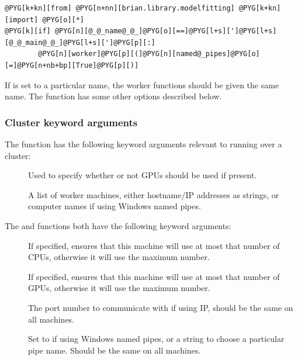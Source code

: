 \documentclass[letterpaper,10pt,english]{manual}
\begin{document}
\begin{Verbatim}[commandchars=@\[\]]
@PYG[k+kn][from] @PYG[n+nn][brian.library.modelfitting] @PYG[k+kn][import] @PYG[o][*]
@PYG[k][if] @PYG[n][@_@_name@_@_]@PYG[o][==]@PYG[l+s][']@PYG[l+s][@_@_main@_@_]@PYG[l+s][']@PYG[p][:]
        @PYG[n][worker]@PYG[p][(]@PYG[n][named@_pipes]@PYG[o][=]@PYG[n+nb+bp][True]@PYG[p][)]
\end{Verbatim}

If  is set to a particular name, the worker functions should be
given the same name. The  function has some other
options described below.


\subsubsection{Cluster keyword arguments}

The \hyperlink{brian.library.modelfitting.modelfitting}{} function has the following keyword arguments relevant
to running over a cluster:
\begin{description}
\item[] \leavevmode
Used to specify whether or not GPUs should be used if present.

\item[] \leavevmode
A list of worker machines, either hostname/IP addresses as strings, or
computer names if using Windows named pipes.

\end{description}

The \hyperlink{brian.library.modelfitting.modelfitting}{} and  functions both have
the following keyword arguments:
\begin{description}
\item[] \leavevmode
If specified, ensures that this machine will use at most that number of
CPUs, otherwise it will use the maximum number.

\item[] \leavevmode
If specified, ensures that this machine will use at most that number of
GPUs, otherwise it will use the maximum number.

\item[] \leavevmode
The port number to communicate with if using IP, should be the same on
all machines.

\item[] \leavevmode
Set to  if using Windows named pipes, or a string to choose a
particular pipe name. Should be the same on all machines.

\end{description}
\end{document}
